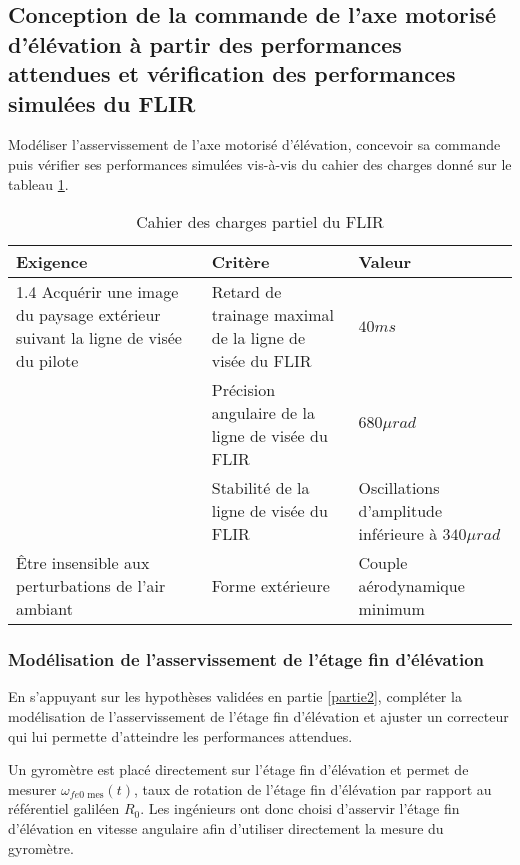 
\subsection{Conception de la commande de l'axe motorisé d'élévation à partir
des performances attendues et vérification des performances
simulées du FLIR}

\begin{obj}
Modéliser l'asservissement de l'axe motorisé d'élévation, concevoir sa commande puis vérifier ses performances
simulées vis-à-vis du cahier des charges donné sur le tableau \ref{tab2}.
\end{obj}

\begin{table}[!htb]
\begin{center}
\begin{tabular}{|p{}|p{}|p{}|}
\hline 
\textbf{Exigence} & \textbf{Critère} & \textbf{Valeur} \\ 
\hline 
1.4 Acquérir une image du paysage
extérieur suivant la ligne de visée
du pilote & Retard de trainage maximal de la
ligne de visée du FLIR & $40ms$ \\ 
\cline{2-3} 
& Précision angulaire de la ligne de
visée du FLIR & $680\mu rad$\\ 
\cline{2-3}  
 & Stabilité de la ligne de visée du
FLIR & Oscillations d'amplitude inférieure
à $340 \mu rad$ \\ 
\hline  
Être insensible aux perturbations
de l'air ambiant & Forme extérieure & Couple aérodynamique minimum\\ 
\hline
\end{tabular} 
\caption{Cahier des charges partiel du FLIR \label{tab2}}
\end{center}
\end{table}

\subsubsection{Modélisation de l'asservissement de l'étage fin d'élévation}

\begin{obj}
En s'appuyant sur les hypothèses validées en partie \ref{partie2}, compléter la modélisation de l'asservissement de
l'étage fin d'élévation et ajuster un correcteur qui lui permette d'atteindre les performances attendues.
\end{obj}

Un gyromètre est placé directement sur l'étage fin d'élévation et permet de mesurer $\omega_{fe0\text{ mes}}(t)$, taux de rotation de l'étage fin d'élévation par rapport au référentiel galiléen $R_0$. Les ingénieurs ont donc choisi d'asservir l'étage
fin d'élévation en vitesse angulaire afin d'utiliser directement la mesure du gyromètre.

